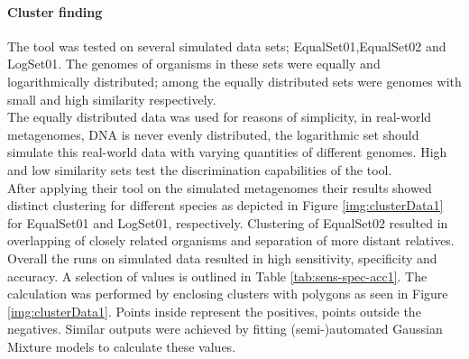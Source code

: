 \documentclass[twocolumn]{bmcart}%
\begin{document}
\paragraph*{Cluster finding}
The tool was tested on several simulated data sets; EqualSet01,EqualSet02 and LogSet01. The genomes of organisms in these sets were equally and logarithmically distributed; among the equally distributed sets were genomes with small and high similarity respectively. \\
The equally distributed data was used for reasons of simplicity, in real-world metagenomes, DNA is never evenly distributed, the logarithmic set should simulate this real-world data with varying quantities of different genomes. High and low similarity sets test the discrimination capabilities of the tool.\\
After applying their tool on the simulated metagenomes their results showed distinct clustering for different species as depicted in Figure \ref{img:clusterData1} for EqualSet01 and LogSet01, respectively. Clustering of EqualSet02 resulted in overlapping of closely related organisms and separation of more distant relatives. \\
Overall the runs on simulated data resulted in high sensitivity, specificity and accuracy. A selection of values is outlined in Table \ref{tab:sens-spec-acc1}. The calculation was performed by enclosing clusters with polygons as seen in Figure \ref{img:clusterData1}. Points inside represent the positives, points outside the negatives. Similar outputs were achieved by fitting (semi-)automated Gaussian Mixture models to calculate these values.
\end{document}

